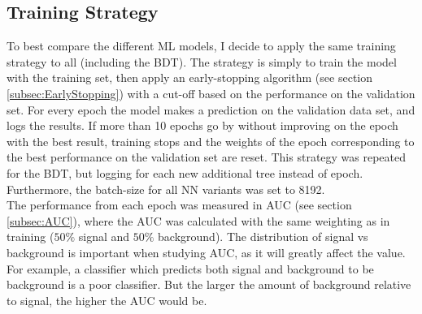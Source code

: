 \subsection{Training Strategy}\label{subsec:TrainingStrategy}
To best compare the different \ac{ML} models, I decide to apply the same training strategy to all (including the \ac{BDT}). The strategy is simply to train the model 
with the training set, then apply an early-stopping algorithm (see section \ref{subsec:EarlyStopping}) with a cut-off based on the performance on the validation set. For 
every epoch the model makes a prediction on the validation data set, and logs the results. If more than 10 epochs go by without improving on the epoch with the best result,
training stops and the weights of the epoch corresponding to the best performance on the validation set are reset. This strategy was repeated for the \ac{BDT}, but logging 
for each new additional tree instead of epoch. Furthermore, the batch-size for all \ac{NN} variants was set to 8192.
\\
The performance from each epoch was measured in \ac{AUC} (see section \ref{subsec:AUC}), where the \ac{AUC} was calculated with the same weighting as in training ($50\%$ signal
and $50\%$ background). The distribution of signal vs background is important when studying \ac{AUC}, as it will greatly affect the value. For example, a classifier which predicts 
both signal and background to be background is a poor classifier. But the larger the amount of background relative to signal, the higher the \ac{AUC} would be. 